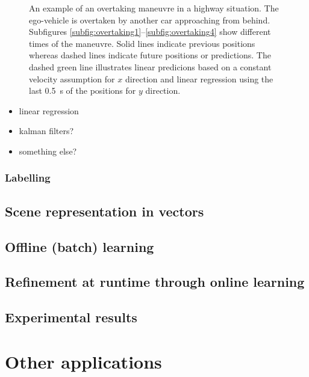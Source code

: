 \begin{figure}[t!]
	
	\caption{An example of an overtaking maneuvre in a highway situation. The ego-vehicle is overtaken by another car approaching from behind. Subfigures \ref{subfig:overtaking1}--\ref{subfig:overtaking4} show different times of the maneuvre. Solid lines indicate previous positions whereas dashed lines indicate future positions or predictions. The dashed green line illustrates linear predicions based on a constant velocity assumption for $x$ direction and linear regression using the last \SI{0.5}{\second} of the positions for $y$ direction.}\label{fig:overtaking2}
\end{figure}
\begin{itemize}
	\item linear regression
	\item kalman filters?
	\item something else?
\end{itemize}
\subsubsection{Labelling}

\subsection{Scene representation in vectors}
\subsection{Offline (batch) learning}
\subsection{Refinement at runtime through online learning}
\subsection{Experimental results}
\section{Other applications}